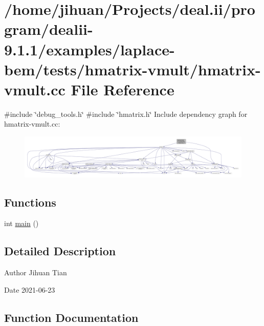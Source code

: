 \hypertarget{hmatrix-vmult_8cc}{}\section{/home/jihuan/\+Projects/deal.ii/program/dealii-\/9.1.1/examples/laplace-\/bem/tests/hmatrix-\/vmult/hmatrix-\/vmult.cc File Reference}
\label{hmatrix-vmult_8cc}
{\ttfamily \#include \char`\"{}debug\+\_\+tools.\+h\char`\"{}}\newline
{\ttfamily \#include \char`\"{}hmatrix.\+h\char`\"{}}\newline
Include dependency graph for hmatrix-\/vmult.cc\+:\nopagebreak
\begin{figure}[H]
\begin{center}
\leavevmode
\includegraphics[width=350pt]{hmatrix-vmult_8cc__incl}
\end{center}
\end{figure}
\subsection*{Functions}
\begin{DoxyCompactItemize}
\item 
int \hyperlink{hmatrix-vmult_8cc_ae66f6b31b5ad750f1fe042a706a4e3d4}{main} ()
\end{DoxyCompactItemize}


\subsection{Detailed Description}
\begin{DoxyAuthor}{Author}
Jihuan Tian 
\end{DoxyAuthor}
\begin{DoxyDate}{Date}
2021-\/06-\/23 
\end{DoxyDate}


\subsection{Function Documentation}
\mbox{\label{hmatrix-vmult_8cc_ae66f6b31b5ad750f1fe042a706a4e3d4}} 
